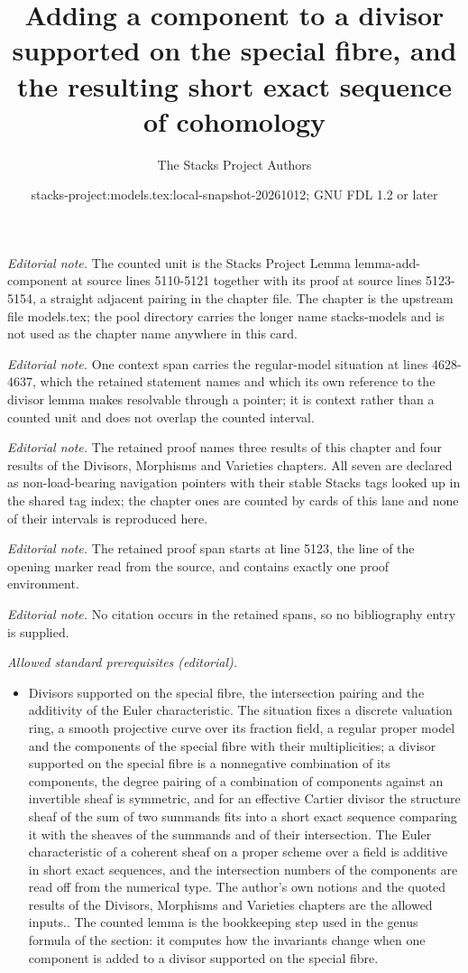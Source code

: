 \documentclass[10pt,a4paper]{amsart}
\title{Adding a component to a divisor supported on the special fibre, and the resulting short exact sequence of cohomology}
\author{The Stacks Project Authors}
\date{stacks-project:models.tex:local-snapshot-20261012; GNU FDL 1.2 or later}
\theoremstyle{plain}
\theoremstyle{definition}
\theoremstyle{remark}
\numberwithin{equation}{subsection}
\begin{document}
\maketitle
\noindent\textit{Editorial note.} The counted unit is the Stacks Project Lemma lemma-add-component at source lines 5110-5121 together with its proof at source lines 5123-5154, a straight adjacent pairing in the chapter file. The chapter is the upstream file models.tex; the pool directory carries the longer name stacks-models and is not used as the chapter name anywhere in this card.\par\medskip
\noindent\textit{Editorial note.} One context span carries the regular-model situation at lines 4628-4637, which the retained statement names and which its own reference to the divisor lemma makes resolvable through a pointer; it is context rather than a counted unit and does not overlap the counted interval.\par\medskip
\noindent\textit{Editorial note.} The retained proof names three results of this chapter and four results of the Divisors, Morphisms and Varieties chapters. All seven are declared as non-load-bearing navigation pointers with their stable Stacks tags looked up in the shared tag index; the chapter ones are counted by cards of this lane and none of their intervals is reproduced here.\par\medskip
\noindent\textit{Editorial note.} The retained proof span starts at line 5123, the line of the opening marker read from the source, and contains exactly one proof environment.\par\medskip
\noindent\textit{Editorial note.} No citation occurs in the retained spans, so no bibliography entry is supplied.\par\medskip
\noindent\textit{Allowed standard prerequisites (editorial).}\begin{itemize}
\item Divisors supported on the special fibre, the intersection pairing and the additivity of the Euler characteristic. The situation fixes a discrete valuation ring, a smooth projective curve over its fraction field, a regular proper model and the components of the special fibre with their multiplicities; a divisor supported on the special fibre is a nonnegative combination of its components, the degree pairing of a combination of components against an invertible sheaf is symmetric, and for an effective Cartier divisor the structure sheaf of the sum of two summands fits into a short exact sequence comparing it with the sheaves of the summands and of their intersection. The Euler characteristic of a coherent sheaf on a proper scheme over a field is additive in short exact sequences, and the intersection numbers of the components are read off from the numerical type. The author's own notions and the quoted results of the Divisors, Morphisms and Varieties chapters are the allowed inputs.. The counted lemma is the bookkeeping step used in the genus formula of the section: it computes how the invariants change when one component is added to a divisor supported on the special fibre.
\end{itemize}\medskip
\end{document}
